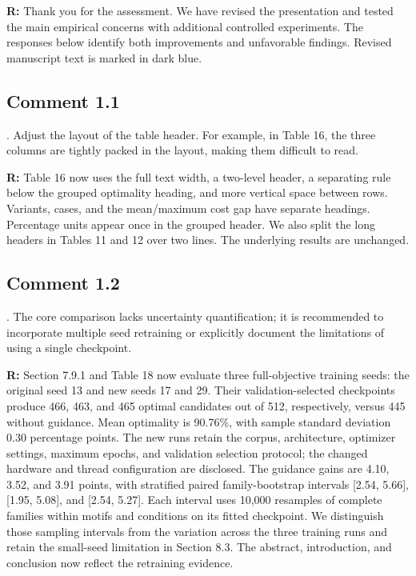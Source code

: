 \documentclass[11pt,a4paper]{article}
\newenvironment{reviewercomment}{%
  \begin{list}{}{\setlength{\leftmargin}{1.5em}%
    \setlength{\rightmargin}{0pt}\setlength{\topsep}{0.5em}}%
  \item\relax\color{reviewerred}\ignorespaces
}{\end{list}}
\begin{document}
{\color{black}\textbf{R:} Thank you for the assessment. We have revised the presentation and tested the main empirical concerns with additional controlled experiments. The responses below identify both improvements and unfavorable findings. Revised manuscript text is marked in dark blue.\par}

\subsection*{Comment 1.1}

\begin{reviewercomment}1. Adjust the layout of the table header. For example, in Table 16, the three columns are tightly packed in the layout, making them difficult to read.\end{reviewercomment}

{\color{black}\textbf{R:} Table 16 now uses the full text width, a two-level header, a separating rule below the grouped optimality heading, and more vertical space between rows. Variants, cases, and the mean/maximum cost gap have separate headings. Percentage units appear once in the grouped header. We also split the long headers in Tables 11 and 12 over two lines. The underlying results are unchanged.\par}

\subsection*{Comment 1.2}

\begin{reviewercomment}2. The core comparison lacks uncertainty quantification; it is recommended to incorporate multiple seed retraining or explicitly document the limitations of using a single checkpoint.\end{reviewercomment}

{\color{black}\textbf{R:} Section 7.9.1 and Table 18 now evaluate three full-objective training seeds: the original seed 13 and new seeds 17 and 29. Their validation-selected checkpoints produce 466, 463, and 465 optimal candidates out of 512, respectively, versus 445 without guidance. Mean optimality is 90.76\%, with sample standard deviation 0.30 percentage points. The new runs retain the corpus, architecture, optimizer settings, maximum epochs, and validation selection protocol; the changed hardware and thread configuration are disclosed. The guidance gains are 4.10, 3.52, and 3.91 points, with stratified paired family-bootstrap intervals [2.54, 5.66], [1.95, 5.08], and [2.54, 5.27]. Each interval uses 10,000 resamples of complete families within motifs and conditions on its fitted checkpoint. We distinguish those sampling intervals from the variation across the three training runs and retain the small-seed limitation in Section 8.3. The abstract, introduction, and conclusion now reflect the retraining evidence.\par}
\end{document}
